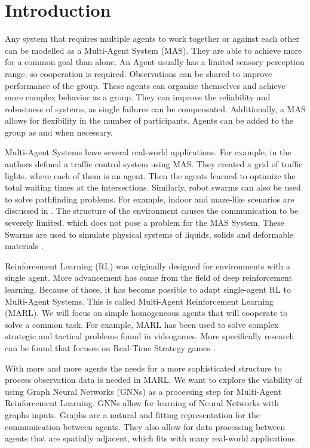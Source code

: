 
\chapter{Introduction}
Any system that requires multiple agents to work together or against each other can be modelled as a Multi-Agent System (MAS). They are able to achieve more for a common goal than alone. An Agent usually has a limited sensory perception range, so cooperation is required. Observations can be shared to improve performance of the group. These agents can organize themselves and achieve more complex behavior as a group. They can improve the reliability and robustness of systems, as single failures can be compensated. Additionally, a MAS allows for flexibility in the number of participants. Agents can be added to the group as and when necessary. \par

Multi-Agent Systems have several real-world applications. For example, in \citet{MARLTraffic2020} the authors defined a traffic control system using MAS. They created a grid of traffic lights, where each of them is an agent. Then the agents learned to optimize the total waiting times at the intersections. Similarly, robot swarms can also be used to solve pathfinding problems. For example, indoor and maze-like scenarios are discussed in \citet{SwarmPathFinding2013}. The structure of the environment causes the communication to be severely limited, which does not pose a problem for the MAS System. These Swarms are used to simulate physical systems of liquids, solids and deformable materials \citep{GNS2020}.
\par

Reinforcement Learning (RL) was originally designed for environments with a single agent. More advancement has come from the field of deep reinforcement learning. Because of those, it has become possible to adapt single-agent RL to Multi-Agent Systems. This is called Multi-Agent Reinforcement Learning (MARL). We will focus on simple homogeneous agents that will cooperate to solve a common task. For example, MARL has been used to solve complex strategic and tactical problems found in videogames. More specifically research can be found that focuses on Real-Time Strategy games \citep{RTSMARL2021}. \par

With more and more agents the needs for a more sophisticated structure to process observation data is needed in MARL. We want to explore the viability of using Graph Neural Networks (GNNs) as a processing step for Multi-Agent Reinforcement Learning. GNNs allow for learning of Neural Networks with graphs inputs. Graphs are a natural and fitting representation for the communication between agents. They also allow for data processing between agents that are spatially adjacent, which fits with many real-world applications. \par

